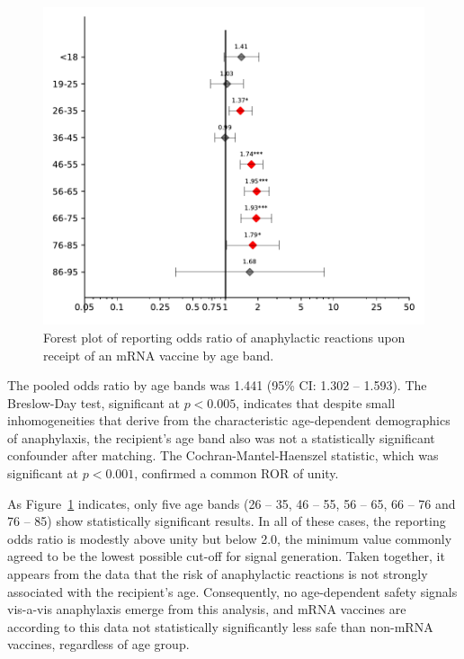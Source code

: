 \documentclass{article}
\begin{document}
\begin{figure}[H]
\centering
\includegraphics[width=12.5 cm]{forest_plot_of_anaphylaxis_by_age}
\caption{Forest plot of reporting odds ratio of anaphylactic reactions upon receipt of an mRNA vaccine by age band.}
\label{fig:age-forest-plot}
\end{figure}

The pooled odds ratio by age bands was 1.441 (95\% CI: 1.302 -- 1.593).
The Breslow-Day test, significant at $p < 0.005$, indicates that despite small inhomogeneities that derive from the characteristic age-dependent demographics of anaphylaxis,\cite{lee2011anaphylaxis} the recipient's age band also was not a statistically significant confounder after matching.
The Cochran-Mantel-Haenszel statistic, which was significant at $p < 0.001$, confirmed a common ROR of unity.

As Figure~\ref{fig:age-forest-plot} indicates, only five age bands (26 -- 35, 46 -- 55, 56 -- 65, 66 -- 76 and 76 -- 85) show statistically significant results.
In all of these cases, the reporting odds ratio is modestly above unity but below 2.0, the minimum value commonly agreed to be the lowest possible cut-off for signal generation.
Taken together, it appears from the data that the risk of anaphylactic reactions is not strongly associated with the recipient's age.
Consequently, no age-dependent safety signals vis-a-vis anaphylaxis emerge from this analysis, and mRNA vaccines are according to this data not statistically significantly less safe than non-mRNA vaccines, regardless of age group.
\end{document}
